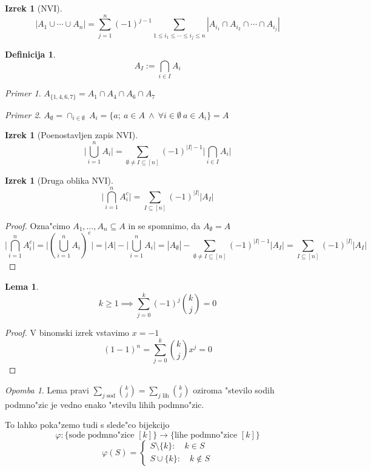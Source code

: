 \documentclass[a4paper,12pt]{article}
\theoremstyle{definition}
\newtheorem{defn}[counter]{Definicija}
\newtheorem{lemma}[counter]{Lema}
\newtheorem{theorem}[counter]{Izrek}
\theoremstyle{remark}
\newtheorem*{ex}{Primer}
\newtheorem*{rem}{Opomba}
\begin{document}
\begin{theorem}[NVI]
	\[|A_1 \cup \cdots \cup A_n| = \sum_{j = 1}^{n} (-1)^{j - 1} \sum_{1 \leqslant i_1 \leqslant \cdots \leqslant i_j \leqslant n}|A_{i_1} \cap A_{i_2} \cap \cdots \cap A_{i_j}|\]
\end{theorem}
\begin{defn}
	\[A_I := \displaystyle \bigcap_{i \in I} A_i \]
\end{defn}
\begin{ex}
	$A_{\{1,4,6,7\}} = A_1 \cap A_4 \cap A_6 \cap A_7$
\end{ex}
\begin{ex}
	$A_{\emptyset} = \cap_{i \in \emptyset} \ A_i = \{a; \ a \in A \ \land \ \forall i \in \emptyset\ a \in A_i \} = A$
\end{ex}
\begin{theorem}[Poenostavljen zapis NVI]
	\[\bigg|\bigcup_{i = 1}^{n} A_i\bigg| = \sum_{\emptyset \neq I \subseteq [n]} (-1)^{|I| - 1} \bigg|\bigcap_{i \in I}A_i\bigg|\]
\end{theorem}
\begin{theorem}[Druga oblika NVI]
	\[\bigg|\bigcap_{i = 1}^n A_i^c\bigg|  = \sum_{I \subseteq [n]} (-1)^{|I|} |A_I|\]
\end{theorem}
\begin{proof}
	Ozna"cimo $A_1, \ldots, A_n \subseteq A$ in se spomnimo, da $A_\emptyset = A$
	\[
		\bigg|\bigcap_{i = 1}^n A_i^c\bigg| =
		\bigg|(\bigcup_{i = 1}^n A_i)^c\bigg| =
		|A| - \bigg|\bigcup_{i = 1}^n A_i\bigg| =
		|A_{\emptyset}| - \sum_{\emptyset \neq I \subseteq [n]} (-1)^{|I|-1} |A_I| =
		\sum_{I \subseteq [n]} (-1)^{|I|} |A_I|
	\]
\end{proof}


\begin{lemma}
\[k \geqslant 1 \implies \sum_{j = 0}^k (-1)^j \binom{k}{j} = 0\]
\end{lemma}

\begin{proof}
	V binomski izrek vstavimo $x = -1$
	\[(1 -1)^n = \sum_{j = 0}^k \binom{k}{j} x^j = 0\]
\end{proof}

\begin{rem}
	Lema pravi $\sum_{j \text{ sod}} \binom{k}{j} = \sum_{j\text{ lih}} \binom{k}{j}$ oziroma "stevilo sodih podmno"zic je vedno enako "stevilu lihih podmno"zic.
\end{rem}

To lahko poka"zemo tudi s slede"co bijekcijo
\[\varphi: \{\text{sode podmno"zice }[k]\} \rightarrow \{\text{lihe podmno"zice }[k]\} \]
\[\varphi (S) = \begin{cases}S \setminus \{k\}: \quad k \in S  \\ S \cup \{k\}: \quad k \notin S \end{cases}\]
\end{document}
